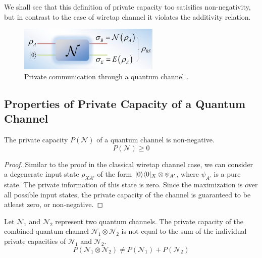 We shall see that this definition of private capacity too satisifies non-negativity, but in contrast to the case of wiretap channel it violates the additivity relation.

\begin{figure}[H]
    \centering
    \includegraphics[width=0.6\textwidth]{figures/private_communication_quantum_channel.png}
    \caption{Private communication through a quantum channel \cite{Gyongyosi_2018}.}
\end{figure}

\subsection{Properties of Private Capacity of a Quantum Channel}

\begin{theorem}
The private capacity $P(\mathcal{N})$ of a quantum channel is non-negative.
$$P(\mathcal{N}) \geq 0$$
\end{theorem}

\begin{proof}
Similar to the proof in the classical wiretap channel case, we can consider a degenerate input state $\rho_{XA'}$ of the form $\lvert0\rangle\langle0\rvert_X \otimes \psi_{A'}$, where $\psi_{A'}$ is a pure state. The private information of this state is zero. Since the maximization is over all possible input states, the private capacity of the channel is guaranteed to be atleast zero, or non-negative.
\end{proof}

\begin{theorem}
Let $\mathcal{N}_1$ and $\mathcal{N}_2$ represent two quantum channels. The private capacity of the combined quantum channel $\mathcal{N}_1 \otimes \mathcal{N}_2$ is not equal to the sum of the individual private capacities of $\mathcal{N}_1$ and $\mathcal{N}_2$.
$$P(\mathcal{N}_1 \otimes \mathcal{N}_2) \neq P(\mathcal{N}_1) + P(\mathcal{N}_2)$$
\end{theorem}

